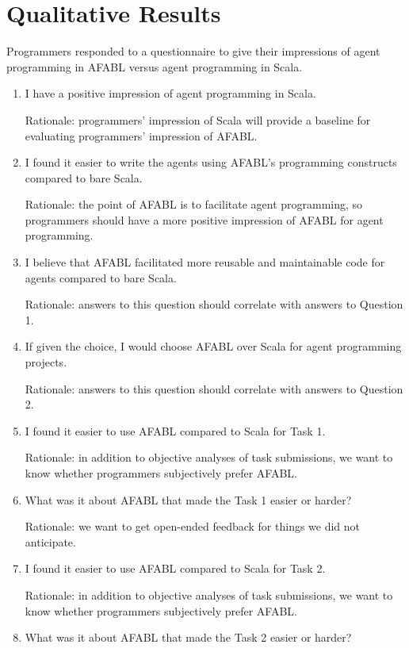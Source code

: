 \section{Qualitative Results}

Programmers responded to a questionnaire to give their impressions of agent programming in AFABL versus agent programming in Scala.

\begin{enumerate}
\item I have a positive impression of agent programming in Scala.

Rationale: programmers’ impression of Scala will provide a baseline for evaluating
programmers’ impression of AFABL.

\item I found it easier to write the agents using AFABL’s programming constructs compared to bare Scala.

Rationale: the point of AFABL is to facilitate agent programming, so programmers should have a more positive impression of AFABL for agent programming.

\item I believe that AFABL facilitated more reusable and maintainable code for agents compared to bare Scala.

Rationale: answers to this question should correlate with answers to Question 1.

\item If given the choice, I would choose AFABL over Scala for agent programming projects.

Rationale: answers to this question should correlate with answers to Question 2.

\item I found it easier to use AFABL compared to Scala for Task 1.

  Rationale: in addition to objective analyses of task submissions, we want to know whether programmers subjectively prefer AFABL.

\item What was it about AFABL that made the Task 1 easier or harder?

Rationale: we want to get open-ended feedback for things we did not anticipate.

\item I found it easier to use AFABL compared to Scala for Task 2.

Rationale: in addition to objective analyses of task submissions, we want to know whether programmers subjectively prefer AFABL.

\item What was it about AFABL that made the Task 2 easier or harder?

\end{enumerate}

